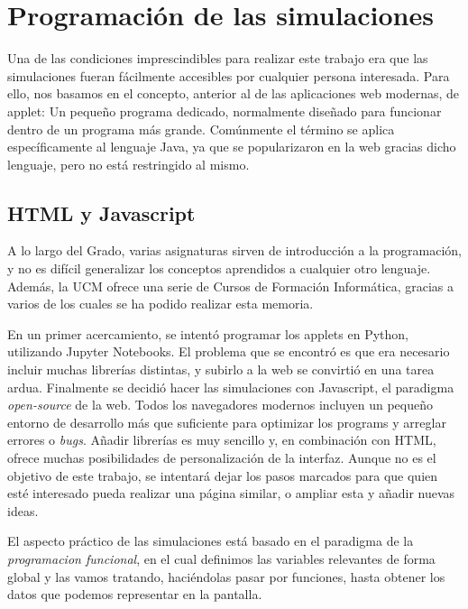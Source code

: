 \documentclass[11pt, a4paper]{article} %
\theoremstyle{named}
\begin{document}
\section{Programación de las simulaciones}\label{sec:programa}

Una de las condiciones imprescindibles para realizar este trabajo era que las simulaciones fueran fácilmente accesibles por cualquier persona interesada.
Para ello, nos basamos en el concepto, anterior al de las aplicaciones web modernas, de applet: Un pequeño programa dedicado, normalmente diseñado para funcionar dentro de un programa más grande. Comúnmente el término se aplica específicamente al lenguaje Java, ya que se popularizaron en la web gracias dicho lenguaje, pero no está restringido al mismo.

\subsection{HTML y Javascript}\label{sec:html}

A lo largo del Grado, varias asignaturas sirven de introducción a la programación, y no es difícil generalizar los conceptos aprendidos a cualquier otro lenguaje. Además, la UCM ofrece una serie de Cursos de Formación Informática, gracias a varios de los cuales se ha podido realizar esta memoria.

En un primer acercamiento, se intentó programar los applets en Python, utilizando Jupyter Notebooks. El problema que se encontró es que era necesario incluir muchas librerías distintas, y subirlo a la web se convirtió en una tarea ardua. Finalmente se decidió hacer las simulaciones con Javascript, el paradigma \textit{open-source} de la web.
Todos los navegadores modernos incluyen un pequeño entorno de desarrollo más que suficiente para optimizar los programs y arreglar errores o \textit{bugs}. Añadir librerías es muy sencillo y, en combinación con HTML, ofrece muchas posibilidades de personalización de la interfaz. Aunque no es el objetivo de este trabajo, se intentará dejar los pasos marcados para que quien esté interesado pueda realizar una página similar, o ampliar esta y añadir nuevas ideas.

El aspecto práctico de las simulaciones está basado en el paradigma de la \textit{programacion funcional}, en el cual definimos las variables relevantes de forma global y las vamos tratando, haciéndolas pasar por funciones, hasta obtener los datos que podemos representar en la pantalla.
\end{document}
